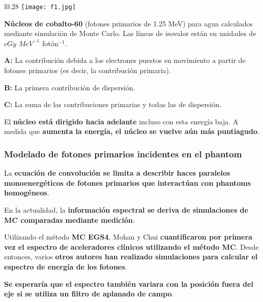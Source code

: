 \documentclass[aspectratio=169,xcolor=dvipsnames,t]{beamer}
\begin{document}
\begin{frame}

    \begin{wrapfigure}{l}{0.28\textwidth}
        \centering
        \texttt{[image: f1.jpg]}
    \end{wrapfigure}

    \textbf{Núcleos de cobalto-60} (fotones primarios de 1.25 MeV) para agua calculados mediante simulación de Monte Carlo. Las líneas de isovalor están en unidades de $cGy$ $MeV^{-1}$ fotón$^{-1}$. 
    
    \textbf{A:} La contribución debida a los electrones puestos en movimiento a partir de fotones primarios (es decir, la contribución primaria). 
    
    \textbf{B:} La primera contribución de dispersión. 
    
    \textbf{C:} La suma de las contribuciones primarias y todas las de dispersión.

    El \textbf{núcleo está dirigido hacia adelante} incluso con esta energía baja. A medida que \textbf{aumenta la energía, el núcleo se vuelve aún más puntiagudo}.
    
\end{frame}

\begin{frame}

    \frametitle{Modelado de fotones primarios incidentes en el phantom}

    La \textbf{ecuación de convolución se limita a describir haces paralelos monoenergéticos de fotones primarios que interactúan con phantoms homogéneos}.

    En la actualidad, la \textbf{información espectral se deriva de simulaciones de MC comparadas mediante medición}. 
    
    Utilizando el método \textbf{MC EGS4}, Mohan y Chui \textbf{cuantificaron por primera vez el espectro de aceleradores clínicos utilizando el método MC}. Desde entonces, varios \textbf{otros autores han realizado simulaciones para calcular el espectro de energía de los fotones}.

    \textbf{Se esperaría que el espectro también variara con la posición fuera del eje si se utiliza un filtro de aplanado de campo}.

\end{frame}
\end{document}
